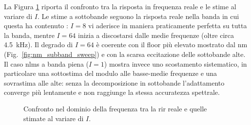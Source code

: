 \documentclass[11pt,a4paper]{article}
\begin{document}
	La Figura \ref{fig:rir_spectrum_subband_sweep} riporta il confronto tra la risposta in frequenza reale e le stime al variare di $I$.
	Le stime a sottobande seguono la risposta reale nella banda in cui questa ha contenuto : $I = 8$ vi aderisce in maniera praticamente perfetta su tutta la banda, mentre $I = 64$ inizia a discostarsi dalle medie frequenze (oltre circa \SI{4.5}{\kilo\hertz}). Il degrado di $I = 64$ è coerente con il floor più elevato mostrato dal \ac{nm} (Fig.~\ref{fig:nm_subband_sweep}) e con la scarsa eccitazione delle sottobande alte.
	Il caso \ac{nlms} a banda piena ($I = 1$) mostra invece uno scostamento sistematico, in particolare una sottostima del modulo alle basse-medie frequenze e una sovrastima alle alte: senza la decomposizione in sottobande l'adattamento converge più lentamente e non raggiunge la stessa accuratezza spettrale.
	
	\begin{figure}[H]
		\centering
		\caption{Confronto nel dominio della frequenza tra la \ac{rir} reale e quelle stimate al variare di $I$.}
		\label{fig:rir_spectrum_subband_sweep}
	\end{figure}
	
\end{document}
